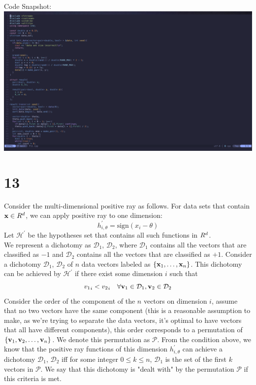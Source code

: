 \documentclass[11pt]{article}
\let\mathbb\relax
\theoremstyle{definition}
\begin{document}
Code Snapshot: \\ 
\includegraphics[width =\textwidth]{P12code.png}
\newpage
\section*{13}
Consider the multi-dimensional positive ray as follows. For data sets that contain $\vb{x} \in \mathbb{R}^d$, we can apply positive ray to one dimension: 
\[
  h^\prime_{i, \theta} = \text{sign}(x_i - \theta)
\]
Let $\mathcal{H}^\prime$ be the hypotheses set that contains all such functions in $\mathbb{R}^d$. \\ 
We represent a dichotomy as $\mathcal{D}_1$, $\mathcal{D}_2$, where $\mathcal{D}_1$ contains all the vectors that are classified as $-1$ and $\mathcal{D}_2$ contains all the vectors that are classified as $+1$.
Consider a dichotomy $\mathcal{D}_1$, $\mathcal{D}_2$ of $n$ data vectors labeled as $\{\vb{x}_1,\dots,\vb{x}_n\}$. This dichotomy can be achieved by $\mathcal{H}^\prime$ if there exist some dimension $i$ such that 
\[
  {v_1}_{i} < {v_2}_{i} \quad \forall \vb{v}_1\in \mathcal{D}_1, \vb{v}_2\in \mathcal{D}_2
\]
Consider the order of the component of the $n$ vectors on dimension $i$, assume that no two vectors have the same component (this is a reasonable assumption to make, as we're trying to separate the data vectors, it's optimal to have vectors that all have different components), this order corresponds to a permutation of $\{\vb{v}_1, \vb{v}_2,\dots,\vb{v}_n\}$. We denote this permutation as $\mathcal{P}$.
From the condition above, we know that the positive ray functions of this dimension $h^\prime_{i, \theta}$ can achieve a dichotomy $\mathcal{D}_1$, $\mathcal{D}_2$ iff for some integer $0 \leq k \leq n$, $\mathcal{D}_1$ is the set of the first $k$ vectors in $\mathcal{P}$. We say that this dichotomy is "dealt with" by the permutation $\mathcal{P}$ if this criteria is met.
\end{document}
